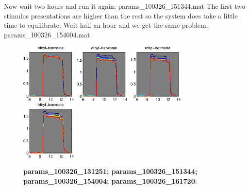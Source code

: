 \documentclass[a4paper]{report}
\begin{document}
Now wait two hours and run it again: params\_100326\_151344.mat
The first two stimulus presentations are higher than the rest so the
system does take a little time to equilibrate. Wait half an hour and
we get the same problem. params\_100326\_154004.mat
\begin{figure}[h]
\centering
\includegraphics[width=1.1in]{params_100326_131251.eps}
\includegraphics[width=1.1in]{params_100326_151344.eps}
\includegraphics[width=1.1in]{params_100326_154004.eps}
\includegraphics[width=1.1in]{params_100326_161720.eps}
\caption{\textbf{params\_100326\_131251; params\_100326\_151344;
    params\_100326\_154004; params\_100326\_161720}:}
\end{figure}
\end{document}
